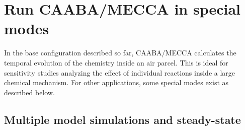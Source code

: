 \documentclass[twoside]{article}
\begin{document}
\section{Run CAABA/MECCA in special modes}
\label{sec:special}

In the base configuration described so far, CAABA/MECCA calculates the
temporal evolution of the chemistry inside an air parcel. This is ideal
for sensitivity studies analyzing the effect of individual reactions
inside a large chemical mechanism. For other applications, some special
modes exist as described below.

\subsection{Multiple model simulations and steady-state}
\label{sec:multirun}
\end{document}
